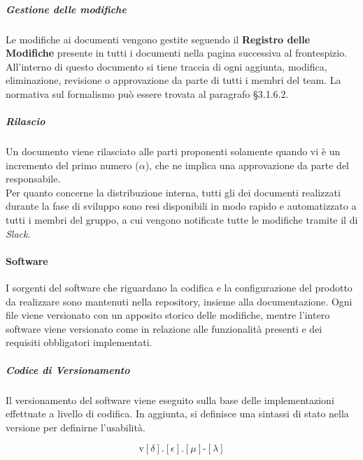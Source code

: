 		\subparagraph{Gestione delle modifiche}

		Le modifiche ai documenti vengono gestite seguendo il \textbf{Registro delle Modifiche} presente in tutti i documenti nella pagina successiva al frontespizio. All'interno di questo documento si tiene traccia di ogni aggiunta, modifica, eliminazione, revisione o approvazione da parte di tutti i membri del team. La normativa sul formalismo può essere trovata al paragrafo \S 3.1.6.2. %

		\subparagraph{Rilascio}

		Un documento viene rilasciato alle parti proponenti solamente quando vi è un incremento del primo numero (\(\alpha\)), che ne implica una approvazione da parte del responsabile. \\ 
		Per quanto concerne la distribuzione interna, tutti gli  dei documenti realizzati durante la fase di sviluppo sono resi disponibili in modo rapido e automatizzato a tutti i membri del gruppo, a cui vengono notificate tutte le modifiche tramite il  di \textit{Slack}.

	\paragraph{Software}

	I sorgenti del software che riguardano la codifica e la configurazione del prodotto da realizzare sono mantenuti nella repository, insieme alla documentazione. Ogni file viene versionato con un apposito storico delle modifiche, mentre l'intero software viene versionato come  in relazione alle funzionalità presenti e dei requisiti obbligatori implementati. 


		\subparagraph{Codice di Versionamento}

		Il versionamento del software viene eseguito sulla base delle implementazioni effettuate a livello di codifica. 
		In aggiunta, si definisce una sintassi di stato nella versione per definirne l'usabilità.

		\[%
			\text{v}[\delta].[\epsilon].[\mu]\text{-}[\lambda]
		\]

